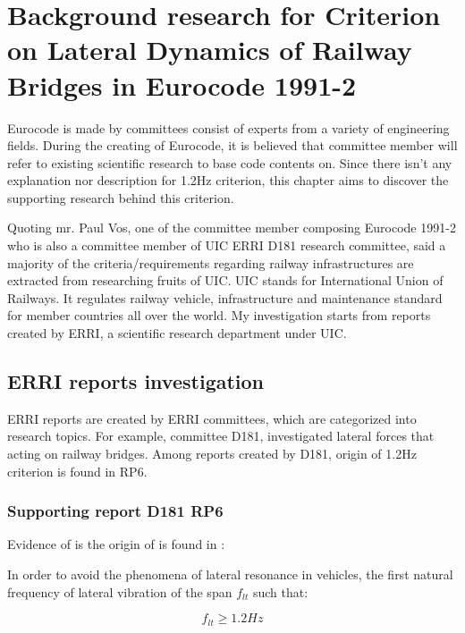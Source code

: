 
\chapter{Background research for Criterion on Lateral Dynamics of Railway Bridges in Eurocode 1991-2}

Eurocode is made by committees consist of experts from a variety of engineering fields. During the creating of Eurocode, it is believed that committee member will refer to existing scientific research to base code contents on. Since there isn't any explanation nor description for 1.2Hz criterion, this chapter aims to discover the supporting research behind this criterion. 

Quoting mr. Paul Vos, one of the committee member composing Eurocode 1991-2 who is also a committee member of UIC ERRI D181 research committee, said a majority of the criteria/requirements regarding railway infrastructures are extracted from researching fruits of UIC. UIC stands for International Union of Railways. It regulates railway vehicle, infrastructure and maintenance standard for member countries all over the world. My investigation starts from reports created by ERRI, a scientific research department under UIC.

\section{ERRI reports investigation}
ERRI reports are created by ERRI committees, which are categorized into research topics. For example, committee D181, investigated lateral forces that acting on railway bridges. Among reports created by D181, origin of 1.2Hz criterion is found in RP6. 

\subsection{Supporting report D181 RP6}\label{sec:1.2hz}

Evidence of \cite{d181} is the origin of \cite[A.2.4.4.2.4(3)]{EC12} is found in \cite[p4.2: Lateral Frequencies]{d181}:

In order to avoid the phenomena of lateral resonance in vehicles, the first natural frequency of lateral vibration of the span $f_{lt}$ such that:

\begin{equation}
f_{lt} \geq 1.2Hz
\end{equation}

